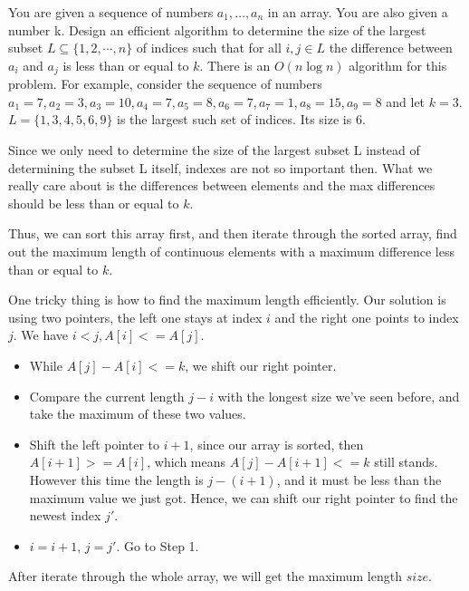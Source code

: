 \newpage
{} %

\problemdes

You are given a sequence of numbers $a_{1}, \dots, a_{n}$ in an array. You are also given a number k. Design an efficient algorithm to determine the size of the largest subset $L \subseteq\{1,2, \cdots, n\}$ of indices such that for all $i, j \in L$ the difference between $a_i$ and $a_j$ is less than or equal to $k$. There is an $O(n \log n)$ algorithm for this problem.
For example, consider the sequence of numbers $a_1 = 7,a_2 = 3,a_3 = 10,a_4 = 7,a_5 = 8,a_6 = 7,a_7 = 1,a_8 = 15,a_9 = 8$ and let $k = 3$. $L = \{1,3,4,5,6,9\}$ is the largest such set of indices. Its size is 6.

\solution


Since we only need to determine the size of the largest subset L instead of determining the subset L itself, indexes are not so important then. What we really care about is the differences between elements and the max differences should be less than or equal to $k$. 

Thus, we can sort this array first, and then iterate through the sorted array, find out the maximum length of continuous elements with a maximum difference less than or equal to $k$. 

One tricky thing is how to find the maximum length efficiently. Our solution is using two pointers, the left one stays at index $i$ and the right one points to index $j$. We have $i<j, A[i]<=A[j]$. 

\begin{itemize}
\item While $A[j]-A[i]<=k$, we shift our right pointer. 
\item Compare the current length $j-i$ with the longest size we've seen before, and take the maximum of these two values.
\item Shift the left pointer to $i+1$, since our array is sorted, then $A[i+1]>=A[i]$, which means $A[j]-A[i+1]<=k$ still stands. However this time the length is $j-(i+1)$, and it must be less than the maximum value we just got. Hence, we can shift our right pointer to find the newest index $j'$.
\item $i=i+1$, $j=j'$. Go to Step 1.
\end{itemize}

After iterate through the whole array, we will get the maximum length $size$.

